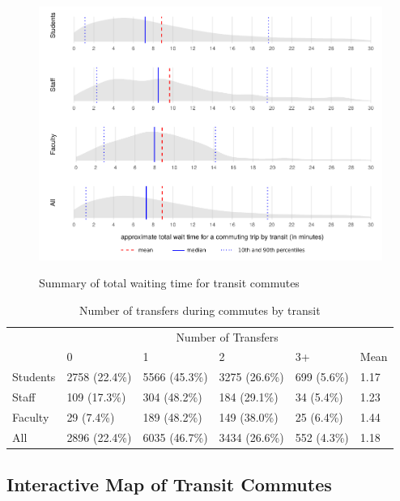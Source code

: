 \documentclass{article}
\begin{document}
	
		\begin{figure}[H]
			\caption{Summary of total waiting time for transit commutes}
			\centering
			
			\hspace*{-23mm}
			\includegraphics[width=6.5in]{figures/o_wait}
			\label{fig:o_wait}
		\end{figure}
	

		\vspace{5mm}
		\begin{table}[H]
			\centering
			\caption{Number of transfers during commutes by transit}
			\label{transfers_table}
			\label{my-label}
			\begin{tabular}{llllll}
				& \multicolumn{5}{c}{Number of Transfers}                            \\
				& 0             & 1             & 2             & 3+          & Mean \\ \hline
				Students & 2758 (22.4\%) & 5566 (45.3\%) & 3275 (26.6\%) & 699 (5.6\%) & 1.17 \\
				Staff    & 109 (17.3\%)  & 304 (48.2\%)  & 184 (29.1\%)  & 34 (5.4\%)  & 1.23 \\
				Faculty  & 29 (7.4\%)    & 189 (48.2\%)  & 149 (38.0\%)  & 25 (6.4\%)  & 1.44 \\
				All      & 2896 (22.4\%) & 6035 (46.7\%) & 3434 (26.6\%) & 552 (4.3\%) & 1.18
			\end{tabular}
		\end{table}
		
		
	\newpage 
		
	\subsection{Interactive Map of Transit Commutes}
		
\end{document}
